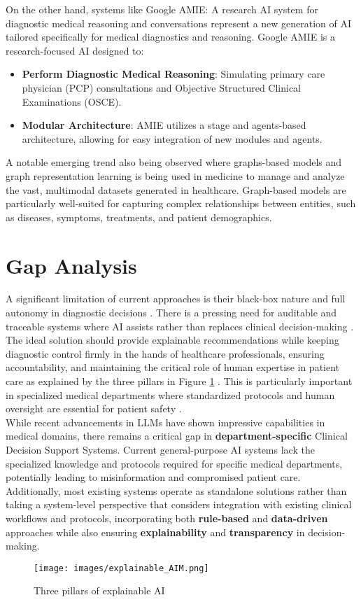 \noindent On the other hand, systems like Google AMIE: A research AI system for diagnostic medical reasoning and conversations \cite{karthikesalingam2024amie} represent a new generation of AI tailored specifically for medical diagnostics and reasoning. Google AMIE is a research-focused AI designed to:
\begin{itemize}
    \item \textcolor{TUMRed}{\textbf{Perform Diagnostic Medical Reasoning}}: Simulating primary care physician (PCP) consultations and Objective Structured Clinical Examinations (OSCE).
    \item \textcolor{TUMRed}{\textbf{Modular Architecture}}: AMIE utilizes a stage and agents-based architecture, allowing for easy integration of new modules and agents.
\end{itemize}
\noindent A notable emerging trend also being observed where graphs-based models and graph representation learning \cite{johnson2024graph} is being used in medicine to manage and analyze the vast, multimodal datasets generated in healthcare. Graph-based models are particularly well-suited for capturing complex relationships between entities, such as diseases, symptoms, treatments, and patient demographics. 

\section{Gap Analysis}

\lettrine{A}{ } significant limitation of current approaches is their black-box nature and full autonomy in diagnostic decisions \cite{clusmann2023future}. There is a pressing need for auditable and traceable systems where AI assists rather than replaces clinical decision-making \cite{cohen2022intelligent}. The ideal solution should provide explainable recommendations while keeping diagnostic control firmly in the hands of healthcare professionals, ensuring accountability, and maintaining the critical role of human expertise in patient care as explained by the three pillars in Figure \ref{fig:explainable_AIM} \cite{explainableAIM}. This is particularly important in specialized medical departments where standardized protocols and human oversight are essential for patient safety \cite{cohen2022intelligent}.\\[\baselineskip]

\noindent While recent advancements in LLMs have shown impressive capabilities in medical domains, there remains a critical gap in \textcolor{TUMRed}{\textbf{department-specific}} Clinical Decision Support Systems. Current general-purpose AI systems lack the specialized knowledge and protocols required for specific medical departments, potentially leading to misinformation and compromised patient care. Additionally, most existing systems operate as standalone solutions rather than taking a system-level perspective that considers integration with existing clinical workflows and protocols, incorporating both \textcolor{TUMRed}{\textbf{rule-based}} and \textcolor{TUMRed}{\textbf{data-driven}} approaches while also ensuring \textcolor{TUMRed}{\textbf{explainability}} and \textcolor{TUMRed}{\textbf{transparency}} in decision-making.

\begin{figure}[h]
    \centering
    \texttt{[image: images/explainable\_AIM.png]}
    \caption{Three pillars of explainable AI}
    \label{fig:explainable_AIM}
\end{figure}